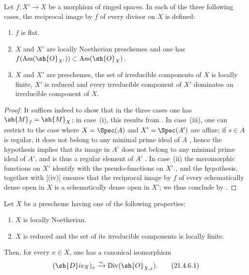 \begin{proposition}[21.4.5]
\label{IV.21.4.5}
Let $f:X'\to X$ be a morphism of ringed spaces.
In each of the three following cases, the reciprocal image by $f$ of every divisor on $X$ is defined:
\begin{enumerate}[label=\emph{(\roman*)}]
  \item $f$ is flat.
  \item $X$ and $X'$ are locally Noetherian preschemes and one has $f(\operatorname{Ass}(\sh{O}_{X'}))\subset\operatorname{Ass}(\sh{O}_X)$.
  \item $X$ and $X'$ are preschemes, the set of irreducible components of $X$ is locally finite, $X'$ is reduced and every irreducible component of $X'$ dominates an irreducible component of $X$.
\end{enumerate}
\end{proposition}

\begin{proof}
It suffices indeed to show that in the three cases one has $\sh{M}_f=\sh{M}_X$;
in case~(i), this results from .
In case~(iii), one can restrict to the case where $X=\Spec(A)$ and $X'=\Spec(A')$ are affine;
if $s\in A$ is regular, it does not belong to any minimal prime ideal of $A$ , hence the hypothesis implies that its image in $A'$ does not belong to any minimal prime ideal of $A'$, and is thus a regular element of $A'$ .
In case~(ii) the meromorphic functions on $X'$ identify with the pseudo-functions on $X'$ , and the hypothesis, together with [(iv)] ensures that the reciprocal image
by $f$ of every schematically dense open in $X$ is a schematically dense open in $X'$;
we thus conclude by .
\end{proof}

\begin{corollary}[21.4.6]
\label{IV.21.4.6}
Let $X$ be a prescheme having one of the following properties:
\begin{enumerate}[label=\emph{(\roman*)}]
  \item $X$ is locally Noetherian.
  \item $X$ is reduced and the set of its irreducible components is locally finite.
\end{enumerate}
Then, for every $x\in X$, one has a canonical isomorphism
\[
\label{IV.21.4.6.1}
  (\sh{D}iv_X)_x\xrightarrow{\sim}\operatorname{Div}(\sh{O}_{X,x}).
  \tag{21.4.6.1}
\]
\end{corollary}


